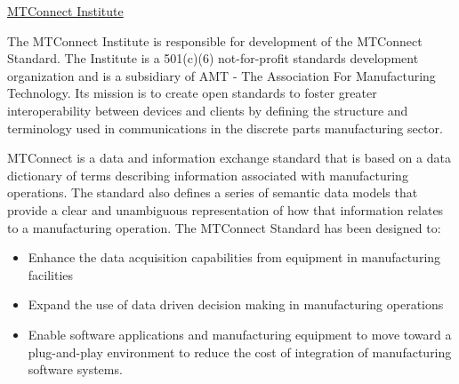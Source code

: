 \quad\underline{MTConnect Institute}

The MTConnect Institute is responsible for development of the MTConnect Standard.  The Institute is a 501(c)(6) not-for-profit standards development organization and is a subsidiary of AMT - The Association For Manufacturing Technology. Its mission is to create open standards to foster greater interoperability between devices and clients by defining the structure and terminology used in communications in the discrete parts manufacturing sector.

MTConnect is a data and information exchange standard that is based on a data dictionary of terms describing information associated with manufacturing operations.  The standard also defines a series of semantic data models that provide a clear and unambiguous representation of how that information relates to a manufacturing operation.  The MTConnect Standard has been designed to:
\begin{itemize}
    \item Enhance the data acquisition capabilities from equipment in manufacturing facilities
    \item Expand the use of data driven decision making in manufacturing operations
    \item Enable software applications and manufacturing equipment to move toward a plug-and-play environment to reduce the cost of integration of manufacturing software systems.  
\end{itemize}

